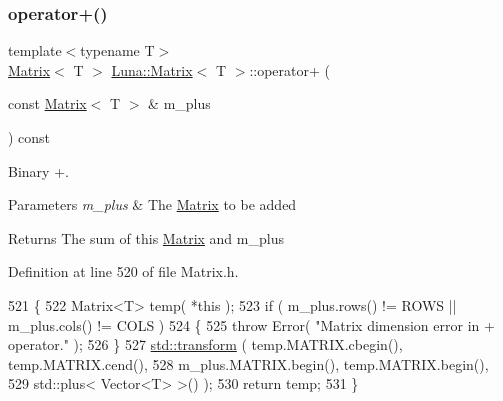 \subsubsection{\texorpdfstring{operator+()}{operator+()}\hspace{0.1cm}{\footnotesize\ttfamily [2/2]}}
{\footnotesize\ttfamily template$<$typename T$>$ \\
\hyperlink{classLuna_1_1Matrix}{Matrix}$<$ T $>$ \hyperlink{classLuna_1_1Matrix}{Luna\+::\+Matrix}$<$ T $>$\+::operator+ (\begin{DoxyParamCaption}\item[{const \hyperlink{classLuna_1_1Matrix}{Matrix}$<$ T $>$ \&}]{m\+\_\+plus }\end{DoxyParamCaption}) const\hspace{0.3cm}{\ttfamily [inline]}}



Binary +. 


\begin{DoxyParams}{Parameters}
{\em m\+\_\+plus} & The \hyperlink{classLuna_1_1Matrix}{Matrix} to be added \\
\hline
\end{DoxyParams}
\begin{DoxyReturn}{Returns}
The sum of this \hyperlink{classLuna_1_1Matrix}{Matrix} and m\+\_\+plus 
\end{DoxyReturn}


Definition at line 520 of file Matrix.\+h.


\begin{DoxyCode}
521   \{
522     Matrix<T> temp( *\textcolor{keyword}{this} );
523     \textcolor{keywordflow}{if} ( m\_plus.rows() != ROWS || m\_plus.cols() != COLS )
524     \{
525       \textcolor{keywordflow}{throw} Error( \textcolor{stringliteral}{"Matrix dimension error in + operator."} );
526     \}
527     \hyperlink{namespaceHeat__plot_aeaa6785bedcad63b4bd40e8cb1bad8a0}{std::transform} ( temp.MATRIX.cbegin(), temp.MATRIX.cend(),
528                      m\_plus.MATRIX.begin(), temp.MATRIX.begin(),
529                      std::plus< Vector<T> >() );
530     \textcolor{keywordflow}{return} temp;
531   \}
\end{DoxyCode}
\mbox{\label{classLuna_1_1Matrix_adb4534f847fcf3d9c6a328210dd7becc}} 
